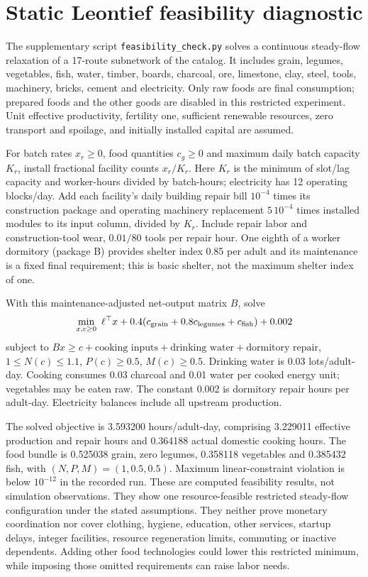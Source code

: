 \documentclass[10pt,a4paper,twocolumn]{article}
\begin{document}
\section{Static Leontief feasibility diagnostic}\label{app:feasibility}
The supplementary script \texttt{feasibility\_check.py} solves a continuous
steady-flow relaxation of a 17-route subnetwork of the catalog. It includes
grain, legumes, vegetables, fish, water, timber, boards, charcoal, ore,
limestone, clay, steel, tools, machinery, bricks, cement and electricity.
Only raw foods are final consumption; prepared foods and the other goods
are disabled in this restricted experiment. Unit effective productivity,
fertility one, sufficient renewable resources, zero transport and spoilage,
and initially installed capital are assumed.

For batch rates $x_r\ge0$, food quantities $c_g\ge0$ and maximum daily
batch capacity $K_r$, install fractional facility counts $x_r/K_r$.
Here $K_r$ is the minimum of slot/lag capacity and worker-hours divided
by batch-hours; electricity has 12 operating blocks/day. Add each
facility's daily building repair bill $10^{-4}$ times its construction
package and operating machinery replacement $5\,10^{-4}$ times installed
modules to its input column, divided by $K_r$. Include repair labor and
construction-tool wear, $0.01/80$ tools per repair hour. One eighth of a
worker dormitory (package B) provides shelter index 0.85 per adult and
its maintenance is a fixed final requirement; this is basic shelter,
not the maximum shelter index of one.

With this maintenance-adjusted net-output matrix $B$, solve
\[
 \min_{x,c\ge0}\ \ell^\top x+
 0.4(c_{\rm grain}+0.8c_{\rm legumes}+c_{\rm fish})+0.002
\]
subject to $Bx\ge c+\text{cooking inputs}+\text{drinking water}
+\text{dormitory repair}$, $1\le N(c)\le1.1$, $P(c)\ge0.5$,
$M(c)\ge0.5$. Drinking water is 0.03 lots/adult-day.
Cooking consumes 0.03 charcoal and 0.01 water per cooked energy unit;
vegetables may be eaten raw. The constant 0.002 is dormitory repair
hours per adult-day. Electricity balances include all upstream production.

The solved objective is 3.593200 hours/adult-day, comprising 3.229011
effective production and repair hours and 0.364188 actual domestic
cooking hours. The food bundle is 0.525038 grain, zero legumes,
0.358118 vegetables and 0.385432 fish, with $(N,P,M)=(1,0.5,0.5)$.
Maximum linear-constraint violation is below $10^{-12}$ in the recorded
run. These are computed feasibility results, not simulation observations.
They show one resource-feasible restricted steady-flow configuration
under the stated assumptions. They neither prove monetary coordination
nor cover clothing, hygiene, education, other services, startup delays,
integer facilities, resource regeneration limits, commuting or inactive
dependents. Adding other food technologies could lower this restricted
minimum, while imposing those omitted requirements can raise labor needs.
\end{document}
